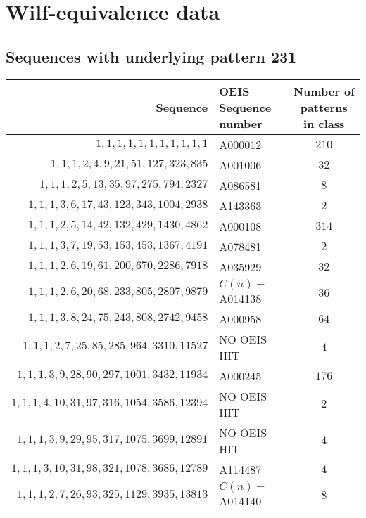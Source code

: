 \chapter{Wilf-equivalence data}
\section{Sequences with underlying pattern 231}
\begin{longtabu}{|r|l|c|}
    \hline
    Sequence & OEIS Sequence number & Number of patterns in class\\
    \hline
    \endfirsthead
    \hline
    \endhead
    \hline
    \endfoot
    \(1,    1,    1,    1,    1,    1,    1,    1,    1,    1,     1\)  & A000012 &\(210\)\\
    \(1,    1,    1,    2,    4,    9,   21,   51,  127,  323,   835\)  & A001006 &\(32\)\\
    \(1,    1,    1,    2,    5,   13,   35,   97,  275,  794,  2327\)  & A086581 &\(8\)\\
    \(1,    1,    1,    3,    6,   17,   43,  123,  343, 1004,  2938\)  & A143363 &\(2\)\\
    \(1,    1,    1,    2,    5,   14,   42,  132,  429, 1430,  4862\)  & A000108 &\(314\)\\
    \(1,    1,    1,    3,    7,   19,   53,  153,  453, 1367,  4191\)  & A078481 &\(2\)\\
    \(1,    1,    1,    2,    6,   19,   61,  200,  670, 2286,  7918\)  & A035929 &\(32\)\\
    \(1,    1,    1,    2,    6,   20,   68,  233,  805, 2807,  9879\)  & \(C(n) -\) A014138 &\(36\)\\
    \(1,    1,    1,    3,    8,   24,   75,  243,  808, 2742,  9458\)  & A000958 &\(64\)\\
    \(1,    1,    1,    2,    7,   25,   85,  285,  964, 3310, 11527\)  & NO OEIS HIT &\(4\)\\
    \(1,    1,    1,    3,    9,   28,   90,  297, 1001, 3432, 11934\)  & A000245 &\(176\)\\
    \(1,    1,    1,    4,   10,   31,   97,  316, 1054, 3586, 12394\)  & NO OEIS HIT &\(2\)\\
    \(1,    1,    1,    3,    9,   29,   95,  317, 1075, 3699, 12891\)  & NO OEIS HIT &\(4\)\\
    \(1,    1,    1,    3,   10,   31,   98,  321, 1078, 3686, 12789\)  & A114487 &\(4\)\\
    \(1,    1,    1,    2,    7,   26,   93,  325, 1129, 3935, 13813\)  & \(C(n) -\) A014140 &\(8\)\\

\end{longtabu}
